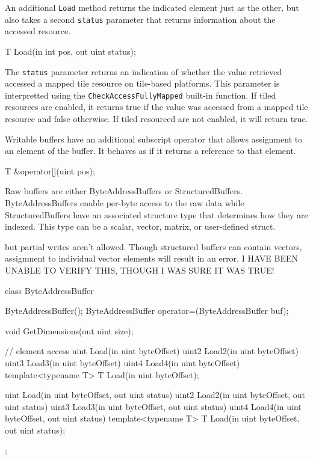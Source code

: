 An additional \texttt{Load} method returns the indicated element just as the other,
but also takes a second \texttt{status} parameter that returns information about the accessed resource.
\begin{HLSL}
 T Load(in int pos, out uint status);
\end{HLSL}

The \texttt{status} parameter returns an indication of whether the value retrieved accessed a mapped tile
resource on tile-based platforms. This parameter is interpretted using the \texttt{CheckAccessFullyMapped}
built-in function. If tiled resources are enabled, it returns true if the value was accessed from a mapped
tile resource and false otherwise. If tiled resourced are not enabled, it will return true.

Writable buffers have an additional subscript operator that allows assignment to an element of the buffer.
It behaves as if it returns a reference to that element.
\begin{HLSL}
 T &operator[](uint pos);
\end{HLSL}


Raw buffers are either ByteAddressBuffers or StructuredBuffers.
ByteAddressBuffers enable per-byte access to the raw data while
StructuredBuffers have an associated structure type that determines how they are
indexed. This type can be a scalar, vector, matrix, or user-defined struct.

but partial writes aren't allowed.
Though structured buffers can contain vectors,
assignment to individual vector elements will result in an error.
I HAVE BEEN UNABLE TO VERIFY THIS, THOUGH I WAS SURE IT WAS TRUE!


\begin{HLSL}
 class ByteAddressBuffer {

   ByteAddressBuffer();
   ByteAddressBuffer operator=(ByteAddressBuffer buf);

   void GetDimensions(out uint size);

   // element access
   uint Load(in uint byteOffset)
   uint2 Load2(in uint byteOffset)
   uint3 Load3(in uint byteOffset)
   uint4 Load4(in uint byteOffset)
   template<typename T>
   T Load(in uint byteOffset);

   uint Load(in uint byteOffset, out uint status)
   uint2 Load2(in uint byteOffset, out uint status)
   uint3 Load3(in uint byteOffset, out uint status)
   uint4 Load4(in uint byteOffset, out uint status)
   template<typename T>
   T Load(in uint byteOffset, out uint status);
};
\end{HLSL}

